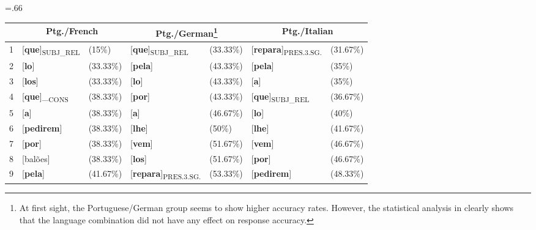 \documentclass[output=paper]{langscibook}
\begin{document}
\begin{table}
\small\tabcolsep=.66\tabcolsep
\begin{tabular}{l *3{l@{~}l}}
\lsptoprule
& \multicolumn{2}{c}{Ptg./French} & \multicolumn{2}{c}{Ptg./German\footnote{At first sight, the Portuguese/German group seems to show higher accuracy rates. However, the statistical analysis in \citet{TorregrossaRinke2022} clearly shows that the language combination did not have any effect on response accuracy.}} & \multicolumn{2}{c}{Ptg./Italian}\\\midrule
1 & {[\textbf{que}]\textsubscript{SUBJ\_REL}}      & (15\%)    & {[\textbf{que}]\textsubscript{SUBJ\_REL}}     & (33.33\%)          & {[\textbf{repara}]\textsubscript{PRES.3.SG.}} & (31.67\%)\\
2 & {[\textbf{lo}]}                                & (33.33\%) & {[\textbf{pela}]}                             & (43.33\%)          & {[\textbf{pela}]}                             & (35\%)\\
3 & {[\textbf{los}]}                               & (33.33\%) & {[\textbf{lo}]}                               & (43.33\%)          & {[\textbf{a}]}                                & (35\%) \\
4 & {[\textbf{que}]\_\textsubscript{CONS}}         & (38.33\%) & {[\textbf{por}]}                              & (43.33\%)          & {[\textbf{que}]\textsubscript{SUBJ\_REL}}     & (36.67\%)\\
5 & {[\textbf{a}]}                                 & (38.33\%) & {[\textbf{a}]}                                & (46.67\%)          & {[\textbf{lo}]}                               & (40\%)\\
6 & {[\textbf{pedirem}]}                           & (38.33\%) & {[\textbf{lhe}]}                              & (50\%)             & {[\textbf{lhe}]}                              & (41.67\%)\\
7 & {[\textbf{por}]}                               & (38.33\%) & {[\textbf{vem}]}                              & {(51.67\%)} & {[\textbf{vem}]}                              & (46.67\%)\\
8 & [balões]                                     & (38.33\%) & {[\textbf{los}]}                              & (51.67\%)          & {[\textbf{por}]}                              & (46.67\%)\\
9 & {[\textbf{pela}]}                              & (41.67\%) & {[\textbf{repara}]\textsubscript{PRES.3.SG.}} & (53.33\%)          & {[\textbf{pedirem}]}                          & (48.33\%)\\

\end{tabular}
\end{table}
\end{document}
